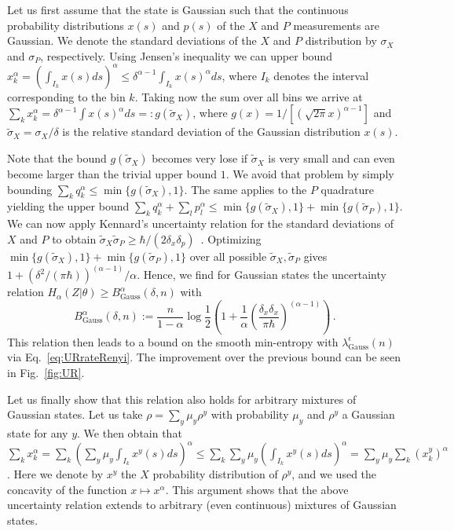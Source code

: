 \documentclass[aps,amsfonts,twoside,amssymb,superscriptaddress,twocolumn]{revtex4-1}
\newcommand*{\gauss}{\textrm{Gauss}}
\begin{document}
Let us first assume that the state is Gaussian such that the continuous probability distributions $x(s)$ and $p(s)$ of the $X$ and $P$ measurements are Gaussian. We denote the standard deviations of the $X$ and $P$ distribution by $\sigma_X$ and $\sigma_P$, respectively. Using Jensen's inequality we can upper bound $ x^\alpha_k = \left(\int_{I_k} x(s) ds \right)^\alpha \leq \delta^{\alpha-1} \int_{I_k} x(s)^\alpha d s$, where $I_k$ denotes the interval corresponding to the bin $k$. Taking now the sum over all bins we arrive at $\sum_k x_k^\alpha = \delta^{\alpha -1 } \int    x(s)^\alpha d s =:g(\tilde \sigma_X)$, where $g(x)  = 1/ [(\sqrt{2\pi}x)^{\alpha-1}]$ and $\tilde\sigma_X=\sigma_X/\delta$ is the relative standard deviation of the Gaussian distribution $x(s)$. 

Note that the bound $g(\tilde\sigma_X)$ becomes very lose if $\tilde\sigma_X$ is very small and can even become larger than the trivial upper bound $1$. We avoid that problem by simply bounding $\sum_k q_k^\alpha \leq \min \{  g(\tilde\sigma_X) , 1\} $. The same applies to the $P$ quadrature yielding the upper bound  $\sum_k q_k^\alpha + \sum_l p^\alpha_l  \leq \min \{  g(\tilde\sigma_X) , 1\} +\min \{  g(\tilde\sigma_P) , 1\} $. We can now apply Kennard's uncertainty relation for the standard deviations of $X$ and $P$ to obtain $\tilde\sigma_X \tilde\sigma_P\geq \hbar/(2\delta_x\delta_p)$~\cite{kennard1927}. Optimizing $\min \{  g(\tilde\sigma_X) , 1\} +\min \{  g(\tilde\sigma_P) , 1\}$ over all possible $\tilde\sigma_X,\tilde \sigma_P$ gives $1 +  (\delta^2 /(\pi \hbar))^{(\alpha-1)}/\alpha$. Hence, we find for Gaussian states the uncertainty relation  $H_\alpha(Z|\theta) \geq B_\gauss^\alpha(\delta,n)$ with 
\begin{equation}
B^\alpha_{\text{Gauss}}(\delta,n) := \frac{n}{1-\alpha} \log\frac
12\left( 1 + \frac{1}{\alpha} \left( \frac{\delta_x\delta_x}{\pi\hbar}\right)^{(\alpha-1)} \right) \, .
\end{equation}
This relation then leads to a bound on the smooth min-entropy with $\lambda^{\epsilon}_\gauss (n)$ via Eq.~\eqref{eq:URrateRenyi}. The improvement over the previous bound can be seen in Fig.~\ref{fig:UR}. 

Let us finally show that this relation also holds for arbitrary mixtures of Gaussian states.  Let us take $\rho = \sum_y \mu_y \rho^y$ with probability $\mu_y$ and $\rho^y$ a Gaussian state for any $y$. We then obtain that $ \sum_k x_k^\alpha = \sum_k (  \sum_y  \mu_y \int_{I_k} x^y(s) ds) ^\alpha \leq \sum_k  \sum_y \mu_y (\int_{I_k} x^y(s)ds) ^\alpha = \sum_y  \mu_y  \sum_k (x_k^y)^\alpha$. Here we denote by $x^y$ the $X$ probability distribution of $\rho^y$, and we used the concavity of the function $x\mapsto x^\alpha$.  This argument shows that the above uncertainty relation extends to arbitrary (even continuous) mixtures of Gaussian states. 
\end{document}
